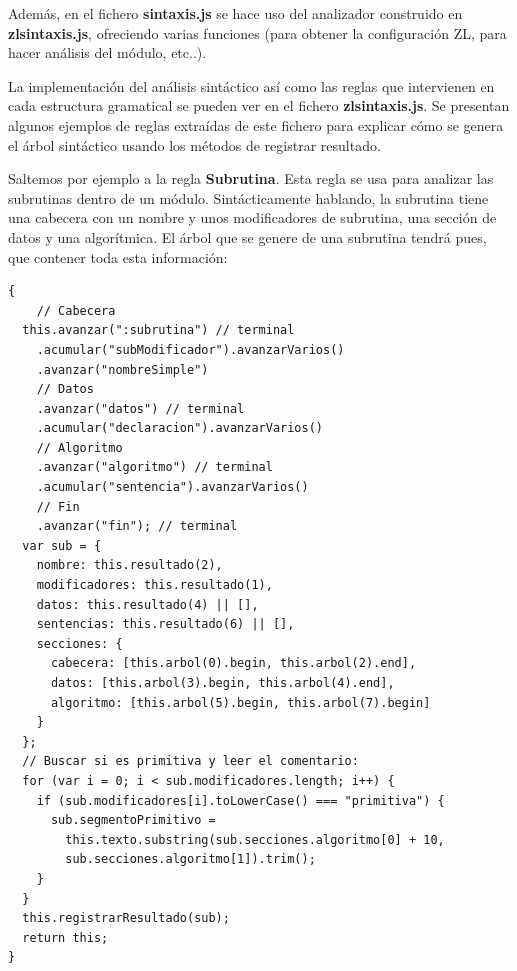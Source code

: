 \documentclass{report}
\begin{document}
	\vspace{10px}
	
	Además, en el fichero \textbf{sintaxis.js} se hace uso del analizador construido en \textbf{zlsintaxis.js}, ofreciendo varias funciones (para obtener la configuración ZL, para hacer análisis del módulo, etc..).
	
	\vspace{10px}
	
	
	La implementación del análisis sintáctico así como las reglas que intervienen en cada estructura gramatical se pueden ver en el fichero \textbf{zlsintaxis.js}. Se presentan algunos ejemplos de reglas extraídas de este fichero para explicar cómo se genera el árbol sintáctico usando los métodos de registrar resultado.
	
	\vspace{10px}
	
	Saltemos por ejemplo a la regla \textbf{Subrutina}. Esta regla se usa para analizar las subrutinas dentro de un módulo. Sintácticamente hablando, la subrutina tiene una cabecera con un nombre y unos modificadores de subrutina, una sección de datos y una algorítmica. El árbol que se genere de una subrutina tendrá pues, que contener toda esta información:
	
\begin{BVerbatim}
{
    // Cabecera
  this.avanzar(":subrutina") // terminal
    .acumular("subModificador").avanzarVarios()
    .avanzar("nombreSimple")
    // Datos
    .avanzar("datos") // terminal
    .acumular("declaracion").avanzarVarios()
    // Algoritmo
    .avanzar("algoritmo") // terminal
    .acumular("sentencia").avanzarVarios()
    // Fin
    .avanzar("fin"); // terminal
  var sub = {
    nombre: this.resultado(2),
    modificadores: this.resultado(1),
    datos: this.resultado(4) || [],
    sentencias: this.resultado(6) || [],
    secciones: {
      cabecera: [this.arbol(0).begin, this.arbol(2).end],
      datos: [this.arbol(3).begin, this.arbol(4).end],
      algoritmo: [this.arbol(5).begin, this.arbol(7).begin]
    }
  };
  // Buscar si es primitiva y leer el comentario:
  for (var i = 0; i < sub.modificadores.length; i++) {
    if (sub.modificadores[i].toLowerCase() === "primitiva") {
      sub.segmentoPrimitivo = 
        this.texto.substring(sub.secciones.algoritmo[0] + 10, 
        sub.secciones.algoritmo[1]).trim();
    }
  }
  this.registrarResultado(sub);
  return this;
}
\end{BVerbatim}
\end{document}
